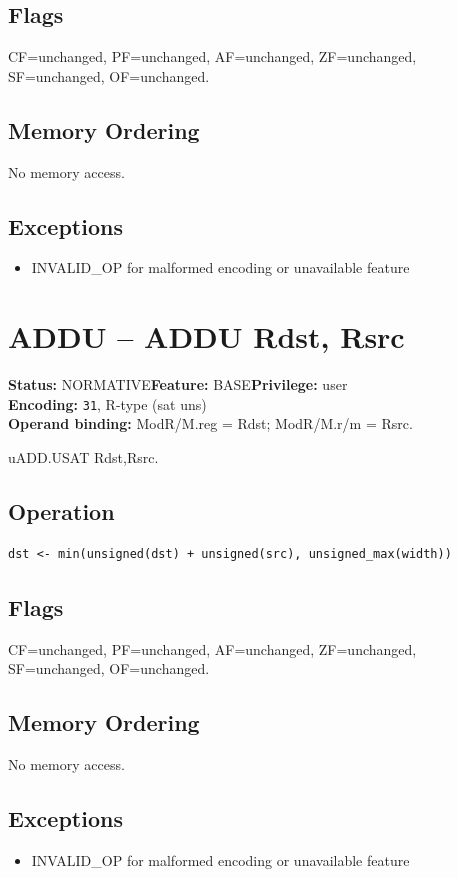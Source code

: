 \documentclass[10pt]{article}
\begin{document}
\subsection*{Flags}
CF=unchanged, PF=unchanged, AF=unchanged, ZF=unchanged, SF=unchanged, OF=unchanged.
\subsection*{Memory Ordering}
No memory access.
\subsection*{Exceptions}
\begin{itemize}
\item INVALID\_OP for malformed encoding or unavailable feature
\end{itemize}
\clearpage

\section{ADDU -- ADDU Rdst, Rsrc}
\textbf{Status:} NORMATIVE\quad \textbf{Feature:} BASE\quad \textbf{Privilege:} user\\
\textbf{Encoding:} \texttt{31}, R-type (sat uns)\\
\textbf{Operand binding:} ModR/M.reg = Rdst; ModR/M.r/m = Rsrc.

uADD.USAT Rdst,Rsrc.

\subsection*{Operation}
\begin{lstlisting}
dst <- min(unsigned(dst) + unsigned(src), unsigned_max(width))
\end{lstlisting}
\subsection*{Flags}
CF=unchanged, PF=unchanged, AF=unchanged, ZF=unchanged, SF=unchanged, OF=unchanged.
\subsection*{Memory Ordering}
No memory access.
\subsection*{Exceptions}
\begin{itemize}
\item INVALID\_OP for malformed encoding or unavailable feature
\end{itemize}
\clearpage
\end{document}
